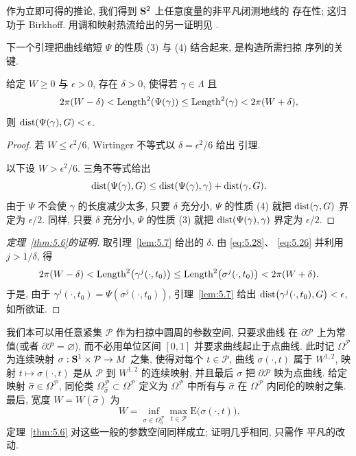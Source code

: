{\setlength{\emergencystretch}{2em}%
作为立即可得的推论, 我们得到 $\mathbf{S}^2$ 上任意度量的非平凡闭测地线的
存在性; 这归功于 Birkhoff. 用调和映射热流给出的另一证明见 \cite{LzWl}.\par}

下一个引理把曲线缩短 $\Psi$ 的性质 (3) 与 (4) 结合起来, 是构造所需扫掠
序列的关键.

\begin{lemma}
\label{lem:5.7}
给定 $W\geq 0$ 与 $\epsilon>0$, 存在 $\delta>0$, 使得若
$\gamma\in\Lambda$ 且
\begin{equation}
2\pi(W-\delta)<\operatorname{Length}^2(\Psi(\gamma))\leq\operatorname{Length}^2(\gamma)
<2\pi(W+\delta),
\label{eq:5.29}
\end{equation}
则 $\operatorname{dist}(\Psi(\gamma),G)<\epsilon$.
\end{lemma}

\begin{proof}
若 $W\leq\epsilon^2/6$, Wirtinger 不等式以 $\delta=\epsilon^2/6$ 给出
引理.

以下设 $W>\epsilon^2/6$. 三角不等式给出
\begin{equation}
\operatorname{dist}(\Psi(\gamma),G)\leq\operatorname{dist}(\Psi(\gamma),\gamma)+\operatorname{dist}(\gamma,G).
\label{eq:5.30}
\end{equation}
由于 $\Psi$ 不会使 $\gamma$ 的长度减少太多, 只要 $\delta$ 充分小,
$\Psi$ 的性质 (4) 就把 $\operatorname{dist}(\gamma,G)$ 界定为 $\epsilon/2$. 同样,
只要 $\delta$ 充分小, $\Psi$ 的性质 (3) 就把
$\operatorname{dist}(\Psi(\gamma),\gamma)$ 界定为 $\epsilon/2$.
\end{proof}

\begin{proof}[定理~\ref{thm:5.6}的证明]
取引理~\ref{lem:5.7} 给出的 $\delta$. 由 \eqref{eq:5.28}、
\eqref{eq:5.26} 并利用 $j>1/\delta$, 得
\begin{equation}
2\pi(W-\delta)<\operatorname{Length}^2\bigl(\gamma^j(\cdot,t_0)\bigr)
\leq\operatorname{Length}^2\bigl(\sigma^j(\cdot,t_0)\bigr)<2\pi(W+\delta).
\label{eq:5.31}
\end{equation}
于是, 由于 $\gamma^j(\cdot,t_0)=\Psi(\sigma^j(\cdot,t_0))$,
引理~\ref{lem:5.7} 给出
$\operatorname{dist}\bigl(\gamma^j(\cdot,t_0),G\bigr)<\epsilon$, 如所欲证.
\end{proof}

我们本可以用任意紧集 $\mathcal{P}$ 作为扫掠中圆周的参数空间, 只要求曲线
在 $\partial\mathcal{P}$ 上为常值(或者 $\partial\mathcal{P}=\varnothing$),
而不必用单位区间 $[0,1]$ 并要求曲线起止于点曲线. 此时记 $\Omega^{\mathcal{P}}$
为连续映射 $\sigma:\mathbf{S}^1\times\mathcal{P}\to M$ 之集, 使得对每个
$t\in\mathcal{P}$, 曲线 $\sigma(\cdot,t)$ 属于 $W^{1,2}$, 映射
$t\mapsto\sigma(\cdot,t)$ 是从 $\mathcal{P}$ 到 $W^{1,2}$ 的连续映射,
并且最后 $\sigma$ 把 $\partial\mathcal{P}$ 映为点曲线. 给定映射
$\hat{\sigma}\in\Omega^{\mathcal{P}}$, 同伦类
$\Omega_{\hat{\sigma}}^{\mathcal{P}}\subset\Omega^{\mathcal{P}}$ 定义为
$\Omega^{\mathcal{P}}$ 中所有与 $\hat{\sigma}$ 在
$\Omega^{\mathcal{P}}$ 内同伦的映射之集. 最后, 宽度
$W=W(\hat{\sigma})$ 为
\begin{equation}
W=\inf_{\sigma\in\Omega_{\hat{\sigma}}^{\mathcal{P}}}
\max_{t\in\mathcal{P}}\mathrm{E}\bigl(\sigma(\cdot,t)\bigr).
\label{eq:5.32}
\end{equation}
定理~\ref{thm:5.6} 对这些一般的参数空间同样成立; 证明几乎相同, 只需作
平凡的改动.

